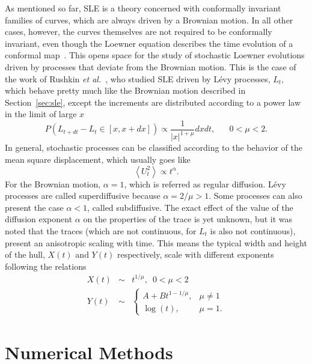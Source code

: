 As mentioned so far, SLE is a theory concerned with conformally invariant
families of curves, which are always driven by a Brownian motion. In all other
cases, however, the curves themselves are not required to be conformally
invariant, even though the Loewner equation describes the time evolution of a
conformal map~\cite{Henkel2012}. This opens space for the study of stochastic
Loewner evolutions driven by processes that deviate from the Brownian motion.
This is the case of the work of Rushkin \textit{et al.}~\cite{Rushkin2006,
Oikonomou2008}, who studied SLE driven by L\'evy processes, $L_t$,
which behave pretty much like the Brownian motion described in
Section~\ref{sec:sle}, except the increments are distributed according to a
power law in the limit of large $x$
\begin{equation}
    P(L_{t+dt} - L_t \in [x, x+dx]) \propto \frac{1}{|x|^{1+\mu}}dxdt,
    \,\,\,\,\,\,\,\,\,\,
    0<\mu<2.
\end{equation}
In general, stochastic processes can be classified according 
to the behavior of the mean square displacement, which usually goes like
\begin{equation}
    \left\langle U_{t}^{2}\right\rangle \propto t^{\alpha}.
\end{equation}
For the Brownian motion, $\alpha=1$, which is referred as regular diffusion.
L\'evy processes are called superdiffusive because $\alpha=2/\mu>1$. Some
processes can also present the case $\alpha<1$, called subdiffusive. The exact
effect of the value of the diffusion exponent $\alpha$ on the properties of the
trace is yet unknown, but it was noted that the traces (which are not
continuous, for $L_t$ is also not continuous), present an anisotropic scaling
with time. This means the typical width and height of the hull, $X(t)$ and $Y(t)$
respectively, scale with different exponents following the relations
\begin{eqnarray}
    \label{eq:aniscale}
    X\left(t\right) & \sim & t^{1/\mu},\,\,\,0<\mu<2\\
    Y\left(t\right) & \sim & \begin{cases}
    A+Bt^{1-1/\mu}, & \mu\neq1\\
    \log\left(t\right), & \mu=1.
    \end{cases}
\end{eqnarray}


\section{Numerical Methods}
\label{sec:num}

